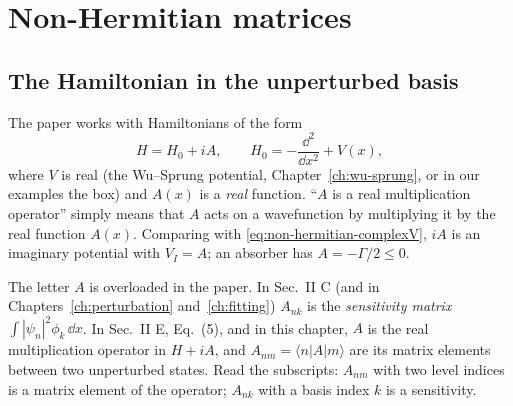 \section{Non-Hermitian matrices}\label{sec:non-hermitian-matrices}

\subsection{The Hamiltonian in the unperturbed basis}

The paper works with Hamiltonians of the form
\begin{equation}
H = H_0 + iA, \qquad H_0 = -\frac{\dd^2}{\dd x^2} + V(x),
\label{eq:non-hermitian-HiA}
\end{equation}
where $V$ is real (the Wu--Sprung potential, Chapter~\ref{ch:wu-sprung}, or in our examples the box) and $A(x)$ is a \emph{real} function. ``$A$ is a real multiplication operator'' simply means that $A$ acts on a wavefunction by multiplying it by the real function $A(x)$. Comparing with \eqref{eq:non-hermitian-complexV}, $iA$ is an imaginary potential with $V_I = A$; an absorber has $A=-\Gamma/2\le0$.

\begin{pitfall}
The letter $A$ is overloaded in the paper. In Sec.~II C (and in Chapters~\ref{ch:perturbation} and~\ref{ch:fitting}) $A_{nk}$ is the \emph{sensitivity matrix} $\int|\psi_n|^2\phi_k\,\dd x$. In Sec.~II E, Eq.~(5), and in this chapter, $A$ is the real multiplication operator in $H+iA$, and $A_{nm}=\langle n|A|m\rangle$ are its matrix elements between two unperturbed states. Read the subscripts: $A_{nm}$ with two level indices is a matrix element of the operator; $A_{nk}$ with a basis index $k$ is a sensitivity.
\end{pitfall}

